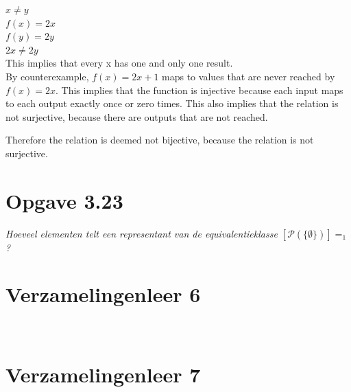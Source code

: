 \documentclass[11pt]{article}
\begin{document}
$ x \neq y $
\\
$ f(x) = 2x $
\\
$ f(y) = 2y $
\\
$ 2x \neq 2y $
\\

This implies that every x has one and only one result.
\\

By counterexample, $ f(x) = 2x + 1$ maps to values that are never reached by $ f(x) = 2x $. This implies that the function is injective because each input maps to each output exactly once or zero times. This also implies that the relation is not surjective, because there are outputs that are not reached.

Therefore the relation is deemed not bijective, because the relation is not surjective.

\section*{Opgave 3.23}
\textit{Hoeveel elementen telt een representant van de equivalentieklasse
$[\mathcal{P}(\{\emptyset\})]=_1  $ ?} \\

\section*{Verzamelingenleer 6}
\textit{} \\

\section*{Verzamelingenleer 7}
\textit{} \\



\end{document}
